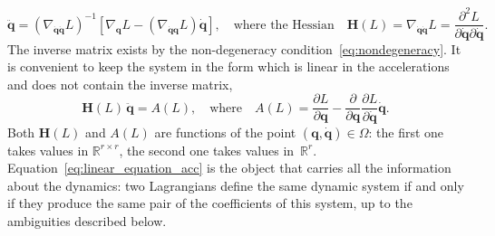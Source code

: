 \documentclass[sn-mathphys-num]{sn-jnl}
\theoremstyle{thmstylethree}
\theoremstyle{thmstyletwo}
\theoremstyle{thmstyleone}
\begin{document}
\begin{equation}
\ddot{\mathbf{q}}
= \left(\nabla_{\dot{\mathbf{q}} \dot{\mathbf{q}}} L\right)^{-1}\left[\nabla_{\mathbf{q}} L-\left(\nabla_{\dot{\mathbf{q}}\mathbf{q}} L\right) \dot{\mathbf{q}}\right], \quad\text{where the Hessian}\quad
\mathbf{H}(L) = \nabla_{\dot{\mathbf{q}}\dot{\mathbf{q}}} L = \frac{\partial^{2} L}{\partial \dot{\mathbf{q}} \partial \dot{\mathbf{q}}}.
\end{equation}
The inverse matrix exists by the non-degeneracy condition~\eqref{eq:nondegeneracy}. It is convenient to keep the system in the form which is linear in the accelerations and does not contain the inverse matrix,
\begin{equation}
\label{eq:linear_equation_acc}
\mathbf{H}(L)\, \ddot{\mathbf{q}} = A(L),
\quad\text{where}\quad
A(L) = \frac{\partial L}{\partial \mathbf{q}}-\frac{\partial}{\partial \mathbf{q}} \frac{\partial L}{\partial \dot{\mathbf{q}}} \dot{\mathbf{q}}.
\end{equation}
Both $\mathbf{H}(L)$ and $A(L)$ are functions of the point $(\mathbf{q}, \dot{\mathbf{q}}) \in \Omega$: the first one takes values in $\mathbb{R}^{r \times r}$, the second one takes values in~$\mathbb{R}^{r}$. Equation~\eqref{eq:linear_equation_acc} is the object that carries all the information about the dynamics: two Lagrangians define the same dynamic system if and only if they produce the same pair of the coefficients of this system, up to the ambiguities described below.
\end{document}
